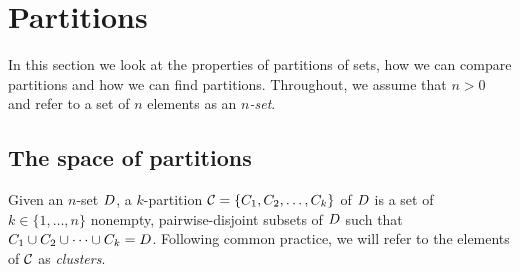 

\section{Partitions}
\label{sec:partitions}

In this section we look at the properties of partitions of sets, how we can
compare partitions and how we can find partitions.  Throughout, we assume that
$n > 0$ and refer to a set of $n$ elements as an \textit{$n$-set}.

\subsection{The space of partitions}
\label{sec:space-partitions}

Given an $n$-set $D$, a $k$-partition $\mathcal{C} = \{C_1,C_2,\dotsc,C_k\}$ of
$D$ is a set of $k \in \{1,\dotsc,n\}$ nonempty, pairwise-disjoint subsets
of $D$ such that $C_1 \cup C_2 \cup \dotsb \cup C_k = D$.  Following
common practice, we will refer to the elements of $\mathcal{C}$ as
\textit{clusters}.

